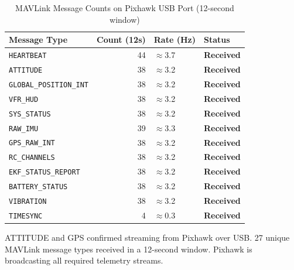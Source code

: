 \documentclass[11pt,a4paper]{article}
\begin{document}
\begin{table}[H]
    \centering
    \begin{tabular}{@{}lrll@{}}
        \toprule
        \textbf{Message Type}       & \textbf{Count (12s)} &
        \textbf{Rate (Hz)}          & \textbf{Status} \\
        \midrule
        \texttt{HEARTBEAT}          & 44  & $\approx$3.7  &
            \textcolor{successgreen}{\textbf{Received}} \\
        \texttt{ATTITUDE}           & 38  & $\approx$3.2  &
            \textcolor{successgreen}{\textbf{Received}} \\
        \texttt{GLOBAL\_POSITION\_INT} & 38 & $\approx$3.2 &
            \textcolor{successgreen}{\textbf{Received}} \\
        \texttt{VFR\_HUD}           & 38  & $\approx$3.2  &
            \textcolor{successgreen}{\textbf{Received}} \\
        \texttt{SYS\_STATUS}        & 38  & $\approx$3.2  &
            \textcolor{successgreen}{\textbf{Received}} \\
        \texttt{RAW\_IMU}           & 39  & $\approx$3.3  &
            \textcolor{successgreen}{\textbf{Received}} \\
        \texttt{GPS\_RAW\_INT}      & 38  & $\approx$3.2  &
            \textcolor{successgreen}{\textbf{Received}} \\
        \texttt{RC\_CHANNELS}       & 38  & $\approx$3.2  &
            \textcolor{successgreen}{\textbf{Received}} \\
        \texttt{EKF\_STATUS\_REPORT}& 38  & $\approx$3.2  &
            \textcolor{successgreen}{\textbf{Received}} \\
        \texttt{BATTERY\_STATUS}    & 38  & $\approx$3.2  &
            \textcolor{successgreen}{\textbf{Received}} \\
        \texttt{VIBRATION}          & 38  & $\approx$3.2  &
            \textcolor{successgreen}{\textbf{Received}} \\
        \texttt{TIMESYNC}           & 4   & $\approx$0.3  &
            \textcolor{successgreen}{\textbf{Received}} \\
        \bottomrule
    \end{tabular}
    \caption{MAVLink Message Counts on Pixhawk USB Port (12-second window)}
\end{table}

\begin{successbox}
    ATTITUDE and GPS confirmed streaming from Pixhawk over USB. 27 unique MAVLink
    message types received in a 12-second window. Pixhawk is broadcasting all
    required telemetry streams.
\end{successbox}
\end{document}
